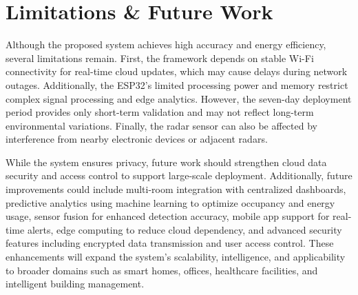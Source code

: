\documentclass[conference]{IEEEtran}
\begin{document}
\section{Limitations \& Future Work}
\label{sec:limitation}
Although the proposed system achieves high accuracy and energy efficiency, several limitations remain. First, the framework depends on stable Wi-Fi connectivity for real-time cloud updates, which may cause delays during network outages. Additionally, the ESP32’s limited processing power and memory restrict complex signal processing and edge analytics. However, the seven-day deployment period provides only short-term validation and may not reflect long-term environmental variations. Finally, the radar sensor can also be affected by interference from nearby electronic devices or adjacent radars.

While the system ensures privacy, future work should strengthen cloud data security and access control to support large-scale deployment. Additionally, future improvements could include multi-room integration with centralized dashboards, predictive analytics using machine learning to optimize occupancy and energy usage, sensor fusion for enhanced detection accuracy, mobile app support for real-time alerts, edge computing to reduce cloud dependency, and advanced security features including encrypted data transmission and user access control. These enhancements will expand the system’s scalability, intelligence, and applicability to broader domains such as smart homes, offices, healthcare facilities, and intelligent building management.
\balance


\end{document}
